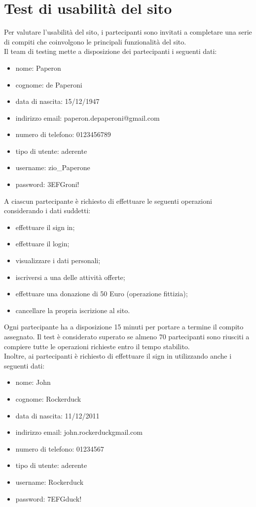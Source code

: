 \documentclass{article}
\begin{document}
\section{Test di usabilità del sito}
Per valutare l'usabilità del sito, i partecipanti sono invitati a completare una serie di compiti che coinvolgono le principali funzionalità del sito.\\
Il team di testing mette a disposizione dei partecipanti i seguenti dati:
\begin{itemize}
    \item nome: Paperon
    \item cognome: de Paperoni
    \item data di nascita: 15/12/1947
    \item indirizzo email: paperon.depaperoni@gmail.com
    \item numero di telefono: 0123456789
    \item tipo di utente: aderente
    \item username: zio\_Paperone
    \item password: 3EFGroni!
\end{itemize}
A ciascun partecipante è richiesto di effettuare le seguenti operazioni considerando i dati suddetti:
\begin{itemize}
    \item effettuare il sign in;
    \item effettuare il login;
    \item visualizzare i dati personali;
    \item iscriversi a una delle attività offerte;
    \item effettuare una donazione di 50 Euro (operazione fittizia);
    \item cancellare la propria iscrizione al sito.
\end{itemize}
Ogni partecipante ha a disposizione 15 minuti per portare a termine il compito assegnato. Il test è considerato superato se almeno 70 partecipanti sono riusciti a compiere tutte le operazioni richieste entro il tempo stabilito.\\
Inoltre, ai partecipanti è richiesto di effettuare il sign in utilizzando anche i seguenti dati:
\begin{itemize}
    \item nome: John
    \item cognome: Rockerduck
    \item data di nascita: 11/12/2011
    \item indirizzo email: john.rockerduckgmail.com
    \item numero di telefono: 01234567
    \item tipo di utente: aderente
    \item username: Rockerduck
    \item password: 7EFGduck!
\end{itemize}
\end{document}

